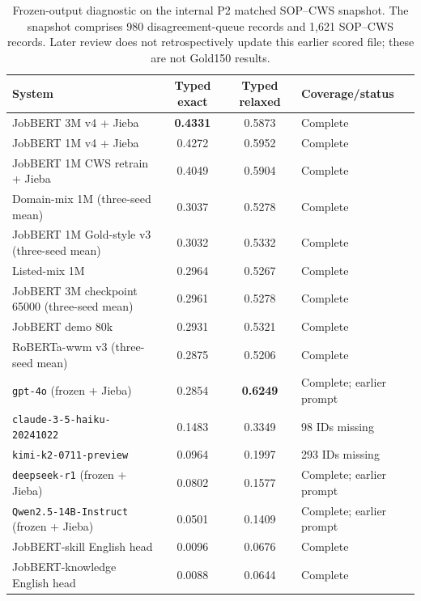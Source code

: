\begin{table}[htbp]
\caption{Frozen-output diagnostic on the internal P2 matched SOP--CWS snapshot. The snapshot comprises 980 disagreement-queue records and 1,621 SOP--CWS records. Later review does not retrospectively update this earlier scored file; these are not Gold150 results.}
\label{tab:legacy-frozen-outputs}
\centering
\scriptsize
\begin{tabularx}{\textwidth}{@{}P{0.40\textwidth}ccL@{}}
\toprule
\textbf{System} & \textbf{Typed exact} & \textbf{Typed relaxed} & \textbf{Coverage/status} \\
\midrule
JobBERT 3M v4 + Jieba & \textbf{0.4331} & 0.5873 & Complete \\
JobBERT 1M v4 + Jieba & 0.4272 & 0.5952 & Complete \\
JobBERT 1M CWS retrain + Jieba & 0.4049 & 0.5904 & Complete \\
Domain-mix 1M (three-seed mean) & 0.3037 & 0.5278 & Complete \\
JobBERT 1M Gold-style v3 (three-seed mean) & 0.3032 & 0.5332 & Complete \\
Listed-mix 1M & 0.2964 & 0.5267 & Complete \\
JobBERT 3M checkpoint 65000 (three-seed mean) & 0.2961 & 0.5278 & Complete \\
JobBERT demo 80k & 0.2931 & 0.5321 & Complete \\
RoBERTa-wwm v3 (three-seed mean) & 0.2875 & 0.5206 & Complete \\
\texttt{gpt-4o} (frozen + Jieba) & 0.2854 & \textbf{0.6249} & Complete; earlier prompt \\
\texttt{claude-3-5-haiku-20241022} & 0.1483 & 0.3349 & 98 IDs missing \\
\texttt{kimi-k2-0711-preview} & 0.0964 & 0.1997 & 293 IDs missing \\
\texttt{deepseek-r1} (frozen + Jieba) & 0.0802 & 0.1577 & Complete; earlier prompt \\
\texttt{Qwen2.5-14B-Instruct} (frozen + Jieba) & 0.0501 & 0.1409 & Complete; earlier prompt \\
JobBERT-skill English head & 0.0096 & 0.0676 & Complete \\
JobBERT-knowledge English head & 0.0088 & 0.0644 & Complete \\
\bottomrule
\end{tabularx}
\end{table}
